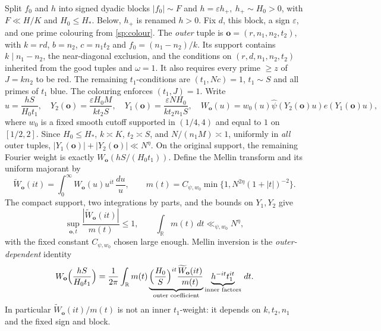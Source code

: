 Split $f_0$ and $h$ into signed dyadic blocks $|f_0|\sim F$ and
$h=\varepsilon h_+,\ h_+\sim H_0>0$, with $F\ll H/K$ and
$H_0\le H_*$. Below, $h_+$ is renamed $h>0$. Fix $d$, this block, a
sign $\varepsilon$, and one prime colouring from \eqref{sp:colour}.
The \emph{outer} tuple is
$\mathbf o=(r,n_1,n_2,t_2)$, with $k=rd$,
$b=n_2$, $c=n_1t_2$ and $f_0=(n_1-n_2)/k$. Its support contains
$k\mid n_1-n_2$, the near-diagonal exclusion, and the conditions on
$(r,d,n_1,n_2,t_2)$ inherited from the good tuples and $\omega=1$.
It also requires every prime $\ge z$ of $J=kn_2$ to be red.
The remaining $t_1$-conditions are $(t_1,Nc)=1$, $t_1\sim S$ and
all primes of $t_1$ blue. The colouring enforces $(t_1,J)=1$.
Write
\[
 u=\frac{hS}{H_0t_1},\quad
 Y_2(\mathbf o)=\frac{\varepsilon H_0M}{kt_2S},\quad
 Y_1(\mathbf o)=\frac{\varepsilon NH_0}{kt_2n_1S},\quad
 W_{\mathbf o}(u)=w_0(u)\hat\psi(Y_2(\mathbf o)u)e(Y_1(\mathbf o)u),
\]
where $w_0$ is a fixed smooth cutoff supported in $(1/4,4)$ and equal
to $1$ on $[1/2,2]$. Since $H_0\le H_*$, $k\asymp K$,
$t_2\asymp S$, and $N/(n_1M)\asymp1$, uniformly in \emph{all}
outer tuples,
$|Y_1(\mathbf o)|+|Y_2(\mathbf o)|\ll N^\eta$.
On the original support, the remaining Fourier weight is exactly
$W_{\mathbf o}(hS/(H_0t_1))$.
Define the Mellin transform and its uniform majorant by
\[
 \widetilde W_{\mathbf o}(it)=\int_0^\infty
 W_{\mathbf o}(u)u^{it}\,\frac{du}{u},\qquad
 m(t)=C_{\psi,w_0}\min\{1,N^{2\eta}(1+|t|)^{-2}\}.
\]
The compact support, two integrations by parts, and the bounds on
$Y_1,Y_2$ give
\[
 \sup_{\mathbf o,t}\frac{|\widetilde W_{\mathbf o}(it)|}{m(t)}\le1,
 \qquad\int_{\mathbb R}m(t)\,dt\ll_{\psi,w_0}N^\eta,
\]
with the fixed constant $C_{\psi,w_0}$ chosen large enough.
Mellin inversion is the \emph{outer-dependent} identity
\[
 W_{\mathbf o}\Bigl(\frac{hS}{H_0t_1}\Bigr)
 =\frac1{2\pi}\int_{\mathbb R}m(t)
 \underbrace{\Bigl(\frac{H_0}{S}\Bigr)^{it}
 \frac{\widetilde W_{\mathbf o}(it)}{m(t)}}_{\text{outer coefficient}}
 \underbrace{h^{-it}t_1^{it}}_{\text{inner factors}}\,dt.
\]
In particular $\widetilde W_{\mathbf o}(it)/m(t)$ is not
an inner $t_1$-weight: it depends on $k,t_2,n_1$ and the fixed
sign and block.

